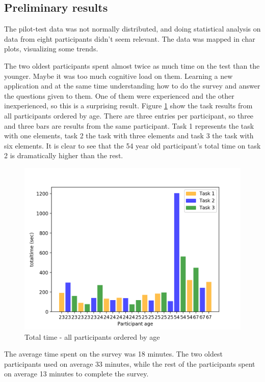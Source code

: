 \subsection{Preliminary results}\label{sec:preliminalyresult}
The pilot-test data was not normally distributed, and doing statistical analysis on data from eight participants didn't seem relevant. The data was mapped in char plots, visualizing some trends. 

The two oldest participants spent almost twice as much time on the test than the younger. Maybe it was too much cognitive load on them. Learning a new application and at the same time understanding how to do the survey and answer the questions given to them. One of them were experienced and the other inexperienced, so this is a surprising result. Figure \ref{fig:allparticipantssortedageparticipantexclude4labelage} show the task results from all participants ordered by age. There are three entries per participant, so three and three bars are results from the same participant. Task 1 represents the task with one elements, task 2 the task with three elements and task 3 the task with six elements.  It is clear to see that the 54 year old participant's total time on task 2 is dramatically higher than the rest.

\begin{figure}[H]
	\centering
	\includegraphics[width=0.7\linewidth]{fig/allParticipants_sorted_Age_Participant_exclude4_labelage}
	\caption[Total time, all]{Total time - all participants ordered by age}
	\label{fig:allparticipantssortedageparticipantexclude4labelage}
\end{figure}

The average time spent on the survey was 18 minutes. The two oldest participants used on average 33 minutes, while the rest of the participants spent on average 13 minutes to complete the survey. 

